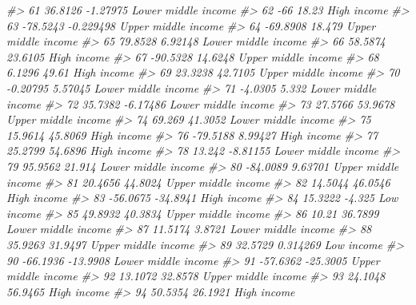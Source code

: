 \documentclass[
  xelatex, ja=standard]{bxjsbook}
\newenvironment{Shaded}{\begin{snugshade}}{\end{snugshade}}
\newcommand{\CommentTok}[1]{\textcolor[rgb]{0.56,0.35,0.01}{\textit{#1}}}
\theoremstyle{definition}
\theoremstyle{definition}
\theoremstyle{definition}
\theoremstyle{definition}
\theoremstyle{remark}
\begin{document}
\begin{Shaded}
\begin{Highlighting}[]
\CommentTok{\#\textgreater{} 61     36.8126   {-}1.27975 Lower middle income}
\CommentTok{\#\textgreater{} 62         {-}66      18.23         High income}
\CommentTok{\#\textgreater{} 63    {-}78.5243  {-}0.229498 Upper middle income}
\CommentTok{\#\textgreater{} 64    {-}69.8908     18.479 Upper middle income}
\CommentTok{\#\textgreater{} 65     79.8528    6.92148 Lower middle income}
\CommentTok{\#\textgreater{} 66     58.5874    23.6105         High income}
\CommentTok{\#\textgreater{} 67    {-}90.5328    14.6248 Upper middle income}
\CommentTok{\#\textgreater{} 68      6.1296      49.61         High income}
\CommentTok{\#\textgreater{} 69     23.3238    42.7105 Upper middle income}
\CommentTok{\#\textgreater{} 70    {-}0.20795    5.57045 Lower middle income}
\CommentTok{\#\textgreater{} 71     {-}4.0305      5.332 Lower middle income}
\CommentTok{\#\textgreater{} 72     35.7382   {-}6.17486 Lower middle income}
\CommentTok{\#\textgreater{} 73     27.5766    53.9678 Upper middle income}
\CommentTok{\#\textgreater{} 74      69.269    41.3052 Lower middle income}
\CommentTok{\#\textgreater{} 75     15.9614    45.8069         High income}
\CommentTok{\#\textgreater{} 76    {-}79.5188    8.99427         High income}
\CommentTok{\#\textgreater{} 77     25.2799    54.6896         High income}
\CommentTok{\#\textgreater{} 78      13.242   {-}8.81155 Lower middle income}
\CommentTok{\#\textgreater{} 79     95.9562     21.914 Lower middle income}
\CommentTok{\#\textgreater{} 80    {-}84.0089    9.63701 Upper middle income}
\CommentTok{\#\textgreater{} 81     20.4656    44.8024 Upper middle income}
\CommentTok{\#\textgreater{} 82     14.5044    46.0546         High income}
\CommentTok{\#\textgreater{} 83    {-}56.0675   {-}34.8941         High income}
\CommentTok{\#\textgreater{} 84     15.3222     {-}4.325          Low income}
\CommentTok{\#\textgreater{} 85     49.8932    40.3834 Upper middle income}
\CommentTok{\#\textgreater{} 86       10.21    36.7899 Lower middle income}
\CommentTok{\#\textgreater{} 87     11.5174     3.8721 Lower middle income}
\CommentTok{\#\textgreater{} 88     35.9263    31.9497 Upper middle income}
\CommentTok{\#\textgreater{} 89     32.5729   0.314269          Low income}
\CommentTok{\#\textgreater{} 90    {-}66.1936   {-}13.9908 Lower middle income}
\CommentTok{\#\textgreater{} 91    {-}57.6362   {-}25.3005 Upper middle income}
\CommentTok{\#\textgreater{} 92     13.1072    32.8578 Upper middle income}
\CommentTok{\#\textgreater{} 93     24.1048    56.9465         High income}
\CommentTok{\#\textgreater{} 94     50.5354    26.1921         High income}

\end{Highlighting}
\end{Shaded}
\end{document}
